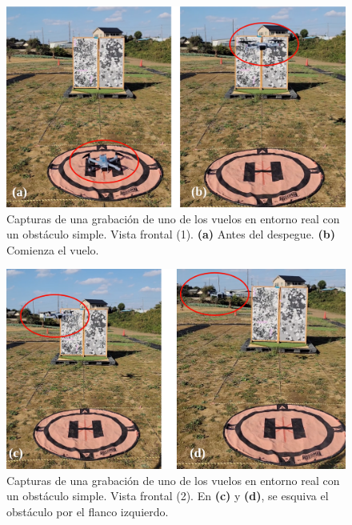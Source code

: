 \begin{figure}[H]
    \centering
    \includegraphics[scale=0.24]{partes/ImgJoao/real-1-single-4-frames-1.png}
    \caption[Capturas de una grabación de uno de los vuelos en entorno real con un obstáculo simple. Vista frontal (1).]{Capturas de una grabación de uno de los vuelos en entorno real con un obstáculo simple. Vista frontal (1). \textbf{(a)} Antes del despegue. \textbf{(b)} Comienza el vuelo.}
    \label{real-1-single-4-frames-1}
\end{figure}

\begin{figure}[H]
    \centering
    \includegraphics[scale=0.24]{partes/ImgJoao/real-1-single-4-frames-2.png}
    \caption[Capturas de una grabación de uno de los vuelos en entorno real con un obstáculo simple. Vista frontal (2).]{Capturas de una grabación de uno de los vuelos en entorno real con un obstáculo simple. Vista frontal (2). En \textbf{(c)} y \textbf{(d)}, se esquiva el obstáculo por el flanco izquierdo.}
    \label{real-1-single-4-frames-2}
\end{figure}

